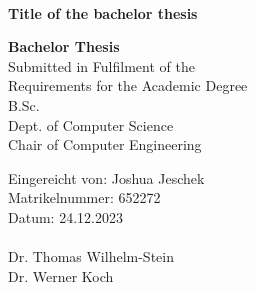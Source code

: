 \documentclass[a4paper, 12pt, oneside, BCOR=1cm,toc=chapterentrywithdots]{scrbook}
\begin{document}
\begin{titlepage}

  \begin{center}
    \\
  \end{center}
  \vspace{0.5cm}

  \begin{center}

    \LARGE{\textbf{Title of the bachelor thesis}}\\
    \vspace{1cm}


    \Large{\textbf{Bachelor Thesis}}\\
    \vspace{1cm}
    Submitted in Fulfilment of the\\
    Requirements for the Academic Degree\\
    B.Sc.\\
    \vspace{0.5cm}
    Dept. of Computer Science\\
    Chair of Computer Engineering
  \end{center}
  \vspace{3cm}
  Eingereicht von: Joshua Jeschek\\
  Matrikelnummer: 652272\\
  Datum: 24.12.2023\\
  \vspace{0.3cm}\\
  Dr. Thomas Wilhelm-Stein \\
  Dr. Werner Koch

\end{titlepage}


\end{document}
